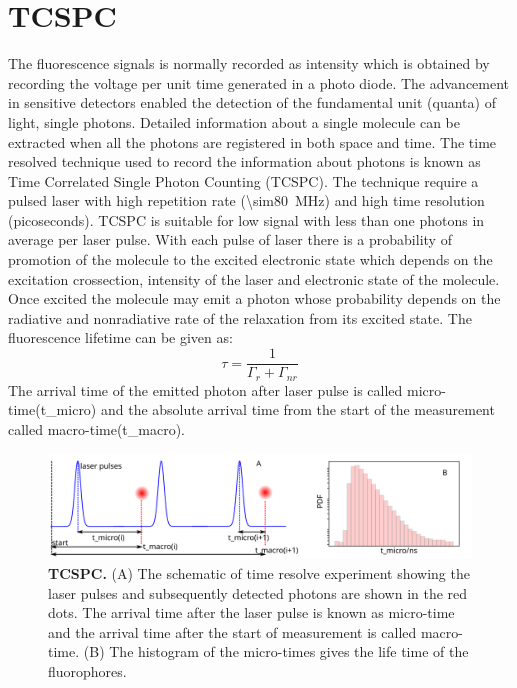 \section{TCSPC}
The fluorescence signals is normally recorded as intensity which is obtained by recording the voltage per unit time generated in a photo diode.
The advancement in sensitive detectors enabled the detection of the fundamental unit (quanta) of light, single photons.
Detailed information about a single molecule can be extracted when all the photons are registered in both space and time.
The time resolved technique used to record the information about photons is known as Time Correlated Single Photon Counting (TCSPC).\cite{oconnor2012timecorrelated,birch2002topics}
The technique require a pulsed laser with high repetition rate (\SI{\sim80}{\MHz}) and high time resolution (picoseconds).
TCSPC is suitable for low signal with less than one photons in average per laser pulse.
With each pulse of laser there is a probability of promotion of the molecule to the excited electronic state which depends on the excitation crossection, intensity of the laser and electronic state of the molecule.
Once excited the molecule may emit a photon whose probability depends on the radiative and nonradiative rate of the relaxation from its excited state.
The fluorescence lifetime can be given as:
\begin{equation}
	\tau = \frac{1}{\Gamma_{r} + \Gamma_{nr}}
\end{equation}
The arrival time of the emitted photon after laser pulse is called micro-time(t\_micro) and the absolute arrival time from the start of the measurement called macro-time(t\_macro).
\begin{figure}
	\centering
	\includegraphics[width=\textwidth]{tcspc_sch}
	\caption{\textbf{TCSPC.} (A) The schematic of time resolve experiment showing the laser pulses and subsequently detected photons are shown in the red dots.
	The arrival time after the laser pulse is known as micro-time and the arrival time after the start of measurement is called macro-time.
	(B) The histogram of the micro-times gives the life time of the fluorophores.}
	\label{fig:tcspc_sch}
\end{figure}
